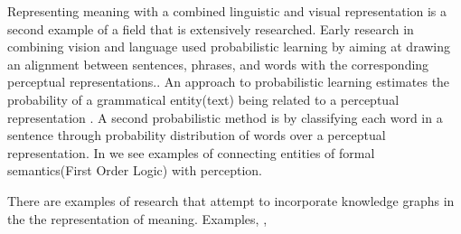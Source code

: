 \documentclass[11pt, a4paper]{article}
\begin{document}
 
Representing meaning with a combined linguistic and visual representation is a second example of a field that is extensively researched. Early research in combining vision and language used probabilistic learning by aiming at drawing an alignment between sentences, phrases, and words with the corresponding perceptual representations.\cite{790410}. An approach  to probabilistic learning estimates the probability of a grammatical entity(text) being related to a perceptual representation \cite{6751319}. A second probabilistic method is by classifying each word in a sentence through probability distribution of words over a perceptual representation. In \cite{matuszek2012joint} \cite{larsson2015formal} we see examples of connecting entities of formal semantics(First Order Logic) with perception. 

There are examples of research that attempt to incorporate knowledge graphs in the the representation of meaning. Examples, \cite{zhu2015building}, \cite{zhu2014reasoning}












\end{document}
